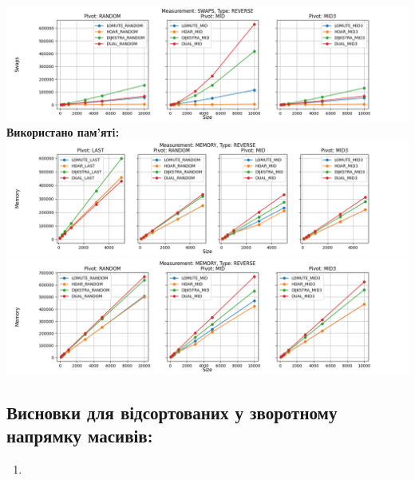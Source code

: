 \documentclass{article}
\begin{document}
        \includegraphics[scale=0.5]{reverse_Swaps_3_pivots_7_numbers.png}
        \newline
    \newpage
    \textbf{Використано пам’ятi:}
    \newline
        \includegraphics[scale=0.5]{reverse_Memory_6_numbers.png}
        \includegraphics[scale=0.5]{reverse_Memory_3_pivots_7_numbers.png}
    \subsection{Висновки для відсортованих у зворотному напрямку масивів:}
    \begin{enumerate}
        \item 
    \end{enumerate}
    \newpage

\end{document}
